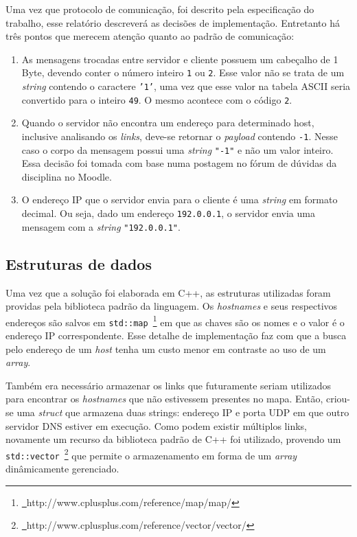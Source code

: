 \documentclass[10pt]{extarticle}
\begin{document}
Uma vez que protocolo de comunicação, foi descrito pela especificação do
trabalho, esse relatório descreverá as decisões de implementação.
Entretanto há três pontos que merecem atenção quanto ao padrão de comunicação:
\begin{enumerate}
    \item As mensagens trocadas entre servidor e cliente possuem um cabeçalho
          de 1 Byte, devendo conter o número inteiro \texttt{1} ou \texttt{2}.
          Esse valor não se trata de um \textit{string} contendo o caractere
          \texttt{'1'}, uma vez que esse valor na tabela ASCII seria convertido
          para o inteiro \texttt{49}. O mesmo acontece com o código \texttt{2}.
    \item Quando o servidor não encontra um endereço para determinado host,
          inclusive analisando os \textit{links}, deve-se retornar o
          \textit{payload} contendo \texttt{-1}. Nesse caso o corpo da mensagem
          possui uma \textit{string} \texttt{"-1"} e não um valor inteiro.
          Essa decisão foi tomada com base numa postagem no fórum de
          dúvidas da disciplina no Moodle.
    \item O endereço IP que o servidor envia para o cliente é uma \textit{string}
          em formato decimal. Ou seja, dado um endereço \texttt{192.0.0.1}, o
          servidor envia uma mensagem com a \textit{string} \texttt{"192.0.0.1"}.
\end{enumerate}


\subsection{Estruturas de dados}
Uma vez que a solução foi elaborada em C++, as estruturas utilizadas foram
providas pela biblioteca padrão da linguagem. Os \textit{hostnames} e seus
respectivos endereços são salvos em \texttt{std::map}\
\footnote{\href{http://www.cplusplus.com/reference/map/map/}\
{http://www.cplusplus.com/reference/map/map/}} em que as chaves são
os nomes e o valor é o endereço IP correspondente.
Esse detalhe de implementação faz com que a busca pelo endereço de um
\textit{host} tenha um custo menor em contraste ao uso de um \textit{array}.

Também era necessário armazenar os links que futuramente seriam utilizados para
encontrar os \textit{hostnames} que não estivessem presentes no mapa.
Então, criou-se uma \textit{struct} que armazena duas strings: endereço IP e
porta UDP em que outro servidor DNS estiver em execução.
Como podem existir múltiplos links, novamente um recurso da biblioteca padrão
de C++ foi utilizado, provendo um \texttt{std::vector}\
\footnote{\href{http://www.cplusplus.com/reference/vector/vector/}\
{http://www.cplusplus.com/reference/vector/vector/}}
que permite o armazenamento em forma de um \textit{array} dinâmicamente
gerenciado.
\end{document}
